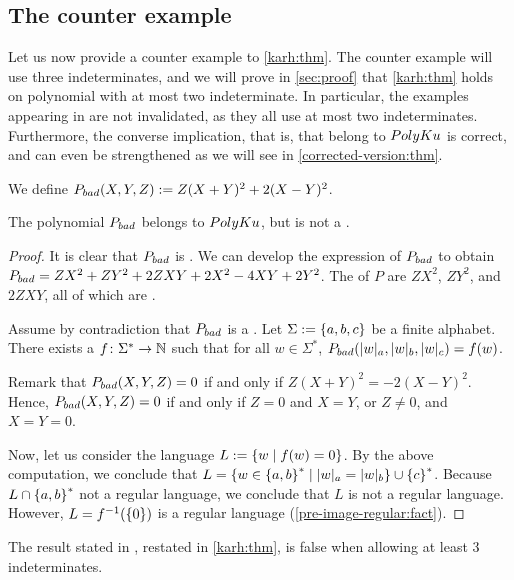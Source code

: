 \subsection{The counter example}
\label{sec:c-example}

Let us now provide a counter example to \cref{karh:thm}. The counter example
will use three indeterminates, and we will prove in \cref{sec:proof} that
\cref{karh:thm} holds on polynomial with at most two indeterminate. In
particular, the examples appearing in \cite{KARH77} are not invalidated, as
they all use at most two indeterminates. Furthermore, the converse implication,
that is, that  belong to $\CoveredPoly$ is
correct, and can even be strengthened as we will see in
\cref{corrected-version:thm}.

\begin{definition}
    \label{def:bad-polynomial}
    We define $\BadPoly(X,Y,Z) \defined Z (X + Y)^2 + 2 (X - Y)^2$.
\end{definition}

\begin{lemma}
    \label{thm:counter-example}
    The polynomial $\BadPoly$ belongs to $\CoveredPoly$,
    but is not a .
\end{lemma}
\begin{proof}
    It is clear that $\BadPoly$ is . We can develop
    the expression of $\BadPoly$ to 
    obtain
    $\BadPoly = ZX^2 + ZY^2 + 2ZXY + 2X^2 -4XY + 2Y^2$.
    The  of $P$
    are $ZX^2$, $ZY^2$, and $2ZXY$, all of which are
    .

    Assume by contradiction that $\BadPoly$ is a .
    Let $\Sigma \mathrel{:=} \mathopen{\{} a,b,c \mathclose{\}}$ be a finite alphabet.
    There exists a 
     $f \colon \Sigma^* \to \mathbb{N}$
    such that for all $w \in \Sigma^*$,
    $\BadPoly(\card[a]{w}, \card[b]{w}, \card[c]{w}) = f(w)$.

    Remark that $\BadPoly(X,Y,Z) = 0$
    if and only if $Z(X+Y)^2 = -2 (X-Y)^2$. Hence,
    $\BadPoly(X,Y,Z)=0$ if and only if $Z = 0$ and $X = Y$, or 
    $Z \neq 0$, and $X = Y = 0$.

    Now, let us consider the language $L \mathrel{:=} \mathopen{\{} w \mid  f(w) = 0 \mathclose{\}}$. By the
    above computation, we conclude that $L = \setof{ w \in \set{a,b}^* }{
    \card[a]{w} = \card[b]{w} } \cup \set{ c }^*$.
    Because $L \cap \mathopen{\{} a,b \mathclose{\}}^*$ not a regular language,
    we
    conclude that $L$ is not a regular language.
    However, $L = f^{-1}(\mathopen{\{} 0 \mathclose{\}})$ is a regular language
    (\cref{pre-image-regular:fact}). 
\end{proof}

\begin{corollary}
    The result stated in \cite[Theorem 3.3]{KARH77}, restated
    in \cref{karh:thm}, is false
    when allowing at least $3$ indeterminates.
\end{corollary}
